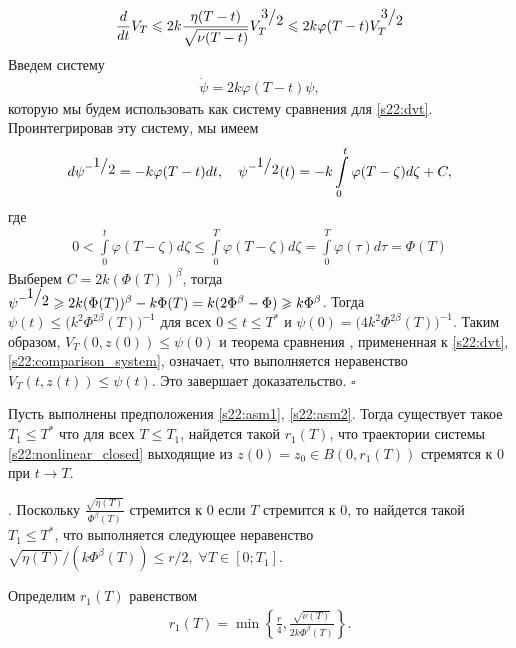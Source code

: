 \documentclass[../main.tex]{subfiles}
\begin{document}
\begin{gather}\label{s22:dvt}
 \frac{d}{dt}V_T \leqslant 2 k \frac{\eta(T-t)}{\sqrt{\nu(T-t)}}V_T^{\frc{3}{2}} \leqslant 2k \varphi(T-t) V_T^{\frc{3}{2}}
\end{gather}
Введем систему
\begin{gather}\label{s22:comparison_system}
 \dot{\psi} = 2k \varphi(T-t) \psi,
\end{gather}
которую мы будем использовать как систему сравнения для \eqref{s22:dvt}. 
Проинтегрировав эту систему, мы имеем
\begin{gather*}
 d\psi^{-\frc{1}{2}} = -k \varphi(T-t) dt, \quad
 \psi^{-\frc{1}{2}}(t) = -k \int\limits_0^t \varphi(T-\zeta) d\zeta + C,
\end{gather*}
где
\begin{gather*}
 0 < \int\limits_0^t \varphi(T-\zeta) d\zeta \leqslant \int\limits_0^T \varphi(T-\zeta) d\zeta = 
 \int\limits_0^T \varphi(\tau) d\tau = \Phi(T) 
\end{gather*}
Выберем $C = 2k (\Phi(T))^{\beta}$, тогда $\psi^{-\frc{1}{2}} \geqslant 2k (\Phi(T))^{\beta} - k \Phi(T) = k (2\Phi^\beta - \Phi)\geqslant k\Phi^\beta $.
Тогда $\psi(t) \leqslant \big(k^2\Phi^{2\beta}(T)\big)^{-1}$ для всех $ 0 \leqslant t \leqslant T^* $ и $\psi(0) = \big(4k^2\Phi^{2\beta}(T)\big)^{-1} $.
Таким образом, $V_T(0,z(0))\leqslant \psi(0)$ и теорема сравнения \cite{walter}, примененная к \eqref{s22:dvt}, \eqref{s22:comparison_system}, означает, что выполняется неравенство $V_T(t,z(t))\leqslant \psi(t)$. 
Это завершает доказательство.
 \hfill $ \square $

\begin{theorem}\label{s22:th:tends_to_zero}
 Пусть выполнены предположения \ref{s22:asm1}, \ref{s22:asm2}. 
Тогда существует такое $ T_1 \leqslant T^*$ что для всех $ T \leqslant T_1$, найдется такой $ r_1(T)$, что траектории системы \eqref{s22:nonlinear_closed} выходящие из $z(0) = z_0 \in B(0,r_1(T))$ стремятся к $0$ при $t \to T$.
\end{theorem}

\doc. 
Поскольку $\frac{\sqrt{\eta(T)}}{\Phi^\beta(T)} $ стремится к $0$ если $T$ стремится к $0$, то найдется такой $ T_1 \leqslant T^*$, что выполняется следующее неравенство
$ \sqrt{\eta(T)}/(k\Phi^\beta(T)) \leqslant r/{2}, \; \forall T \in [0;T_1]$.

Определим $r_1(T)$ равенством
\begin{gather}\label{s22:r1}
 r_1(T) = \min \left\{ \frac{r}{4}, \frac{\sqrt{\nu(T)}}{2k\Phi^\beta(T)} \right\}.
\end{gather}
\end{document}
